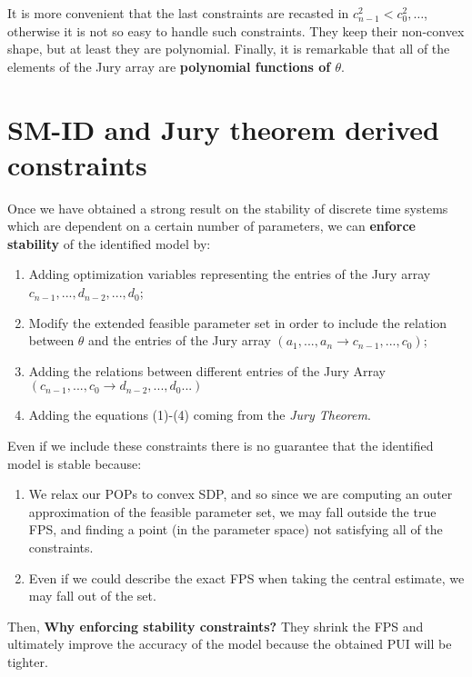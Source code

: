 \noindent
It is more convenient that the last constraints are recasted in $c_{n-1}^2 < c_{0}^2, \dots$, otherwise it is not so easy to handle such constraints. They keep their non-convex shape, but at least they are polynomial. Finally, it is remarkable that all of the elements of the Jury array are \textbf{polynomial functions of $\theta$}.

\section{SM-ID and Jury theorem derived constraints}
Once we have obtained a strong result on the stability of discrete time systems which are dependent on a certain number of parameters, we can \textbf{enforce stability} of the identified model by: 
\begin{enumerate}
    \itemsep-0.2em
    \item Adding optimization variables representing the entries of the Jury array $c_{n-1}, ..., d_{n-2}, ..., d_0$; 
    \item Modify the extended feasible parameter set in order to include the relation between $\theta$ and the entries of the Jury array $(a_1,...,a_n \to c_{n-1}, ..., c_0)$; 
    \item Adding the relations between different entries of the Jury Array $(c_{n-1},...,{c_0} \to d_{n-2}, ..., d_0 ...)$
    \item Adding the equations (1)-(4) coming from the \textit{Jury Theorem}.
\end{enumerate}

\begin{remark}
    Even if we include these constraints there is no guarantee that the identified model is stable because:
    \begin{enumerate}
        \itemsep-0.2em
        \item We relax our POPs to convex SDP, and so since we are computing an outer approximation of the feasible parameter set, we may fall outside the true FPS, and finding a point (in the parameter space) not satisfying all of the constraints.
        \item Even if we could describe the exact FPS when taking the central estimate, we may fall out of the set.
    \end{enumerate}
\end{remark}

\noindent
Then, \textbf{Why enforcing stability constraints?} They shrink the FPS and ultimately improve the accuracy of the model because the obtained PUI will be tighter.

